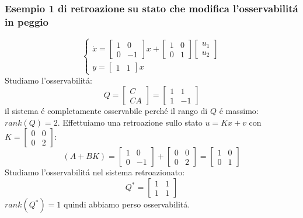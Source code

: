\documentclass[../main.tex]{subfiles}
\begin{document}
	\subsubsection{Esempio 1 di retroazione su stato che modifica l'osservabilit\'a in peggio}
		\[
			\begin{cases}
				\dot x =
				\begin{bmatrix}
					1 & 0\\
					0 & -1
				\end{bmatrix} x +
				\begin{bmatrix}
					1 & 0\\
					0 & 1
				\end{bmatrix}
				\begin{bmatrix}
					u_1\\
					u_2
				\end{bmatrix}
				\\
				y =
				\begin{bmatrix}
					1 & 1
				\end{bmatrix} x
			\end{cases}
		\]
		Studiamo l'osservabilit\'a:
		\[
			Q =
			\begin{bmatrix}
				C\\
				CA
			\end{bmatrix} =
			\begin{bmatrix}
				1 & 1\\
				1 & -1
			\end{bmatrix}
		\]
		il sistema \'e completamente osservabile perch\'e il rango di $ Q $ \'e massimo: $ rank(Q) = 2 $. Effettuiamo una retroazione sullo stato $ u = Kx + v $ con $ K = \left[ \begin{smallmatrix} 0 & 0\\ 0 & 2 \end{smallmatrix} \right] $:
		\[
			(A+BK) =
			\begin{bmatrix}
				1 & 0\\
				0 & -1
			\end{bmatrix} +
			\begin{bmatrix}
				0 & 0\\
				0 & 2
			\end{bmatrix} =
			\begin{bmatrix}
				1 & 0\\
				0 & 1
			\end{bmatrix}
		\]
		Studiamo l'osservabilit\'a nel sistema retroazionato:
		\[
			Q^{*} =
			\begin{bmatrix}
				1 & 1\\
				1 & 1
			\end{bmatrix}
		\]
		$ rank(Q^{*}) = 1 $ quindi abbiamo perso osservabilit\'a.
		
\end{document}
